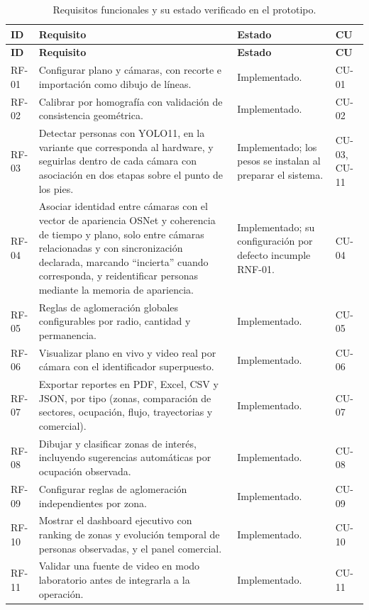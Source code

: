 {\small
\setlength{\LTleft}{0pt}\setlength{\LTright}{0pt}
\begin{longtable}{@{}L{1.3cm}L{6.6cm}L{4.2cm}L{1.9cm}@{}}
\caption{Requisitos funcionales y su estado verificado en el prototipo.}\label{tab:rf}\\
\toprule
\textbf{ID} & \textbf{Requisito} & \textbf{Estado} & \textbf{CU} \\
\midrule
\endfirsthead
\toprule
\textbf{ID} & \textbf{Requisito} & \textbf{Estado} & \textbf{CU} \\
\midrule
\endhead
\bottomrule
\endlastfoot
RF-01 & Configurar plano y cámaras, con recorte e importación como dibujo de líneas. & Implementado. & CU-01 \\
RF-02 & Calibrar por homografía con validación de consistencia geométrica. & Implementado. & CU-02 \\
RF-03 & Detectar personas con YOLO11, en la variante que corresponda al hardware, y seguirlas dentro de cada cámara con asociación en dos etapas sobre el punto de los pies. & Implementado; los pesos se instalan al preparar el sistema. & CU-03, CU-11 \\
RF-04 & Asociar identidad entre cámaras con el vector de apariencia OSNet y coherencia de tiempo y plano, solo entre cámaras relacionadas y con sincronización declarada, marcando \enquote{incierta} cuando corresponda, y reidentificar personas mediante la memoria de apariencia. & Implementado; su configuración por defecto incumple RNF-01. & CU-04 \\
RF-05 & Reglas de aglomeración globales configurables por radio, cantidad y permanencia. & Implementado. & CU-05 \\
RF-06 & Visualizar plano en vivo y video real por cámara con el identificador superpuesto. & Implementado. & CU-06 \\
RF-07 & Exportar reportes en PDF, Excel, CSV y JSON, por tipo (zonas, comparación de sectores, ocupación, flujo, trayectorias y comercial). & Implementado. & CU-07 \\
RF-08 & Dibujar y clasificar zonas de interés, incluyendo sugerencias automáticas por ocupación observada. & Implementado. & CU-08 \\
RF-09 & Configurar reglas de aglomeración independientes por zona. & Implementado. & CU-09 \\
RF-10 & Mostrar el dashboard ejecutivo con ranking de zonas y evolución temporal de personas observadas, y el panel comercial. & Implementado. & CU-10 \\
RF-11 & Validar una fuente de video en modo laboratorio antes de integrarla a la operación. & Implementado. & CU-11 \\

\end{longtable}}
